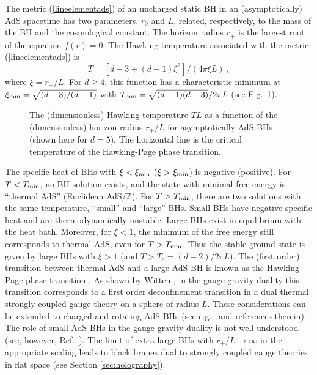 \documentclass[]{iopart}
\def\be{\begin{equation}}
\def\ee{\end{equation}}
\begin{document}
The metric (\ref{lineelementads}) of an uncharged static BH in an
(asymptotically) AdS spacetime has two parameters, $r_0$ and $L$, related,
respectively, to the mass of the BH and the cosmological constant.  The
horizon radius $r_+$ is the largest root of the equation $f(r)=0$.  The
Hawking temperature associated with the metric (\ref{lineelementads}) is
%
\be
T = \left[d-3 +(d-1)\xi^2\right]/\left(4\pi \xi L\right)\,,
\ee
%
where $\xi=r_+/L$. For $d\geq 4$, this function has a characteristic minimum
at $\xi_{\rm min} = \sqrt{(d-3)/(d-1)}$ with $T_{\rm min} =
\sqrt{(d-1)(d-3)}/2\pi L$ (see Fig.~\ref{fig:hpf}).

\begin{figure}[ht]
\begin{center}
\caption{The (dimensionless) Hawking temperature $TL$ as a function of the
  (dimensionless) horizon radius $r_+/L$ for asymptotically AdS BHs (shown
  here for $d=5$). The horizontal line is the critical temperature of the
  Hawking-Page phase transition.
  \label{fig:hpf}}
\end{center}
\end{figure}

The specific heat of BHs with $\xi<\xi_{\rm min}$ ($\xi>\xi_{\rm min}$) is
negative (positive). For $T<T_{\rm min}$, no BH solution exists, and the state
with minimal free energy is ``thermal AdS'' (Euclidean AdS$/\mathbb{Z}$).  For
$T>T_{\rm min}$, there are two solutions with the same temperature, ``small''
and ``large'' BHs. Small BHs have negative specific heat and are
thermodynamically unstable.
%
Large BHs exist in equilibrium with the heat bath. Moreover, for $\xi<1$, the
minimum of the free energy still corresponds to thermal AdS, even for
$T>T_{\rm min}$.  
%
Thus the stable ground state is given by large BHs with $\xi>1$ (and
$T>T_{c}=(d-2)/2\pi L$). The (first order) transition between thermal AdS and
a large AdS BH is known as the Hawking-Page phase transition
\cite{Hawking:1982dh}.  As shown by Witten \cite{Witten:1998zw}, in the
gauge-gravity duality this transition corresponds to a first order
deconfinement transition in a dual thermal strongly coupled gauge theory on a
sphere of radius $L$.  These considerations can be extended to charged and
rotating AdS BHs (see e.g.~\cite{Chamblin:1999tk,Yamada:2006rx} and references
therein).  The role of small AdS BHs in the gauge-gravity duality is not well
understood (see, however, Ref.~\cite{Asplund:2008xd}).  The limit of extra
large BHs with $r_+/L \to \infty$ in the appropriate scaling leads to black
branes dual to strongly coupled gauge theories in flat space (see Section
\ref{sec:holography}).
\end{document}

